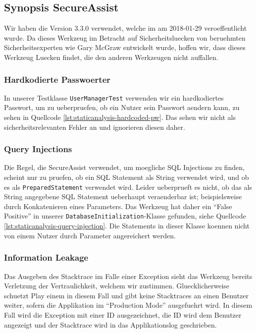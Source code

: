 \documentclass[12pt,DIV14,BCOR10mm,a4paper,twoside,parskip=half-,headsepline,headinclude,english,ngerman,bibliography=totocnumbered]{scrreprt}
\begin{document}
\subsection{Synopsis SecureAssist}

Wir haben die Version 3.3.0 verwendet, welche im am 2018-01-29 veroeffentlicht wurde.
Da dieses Werkzeug im Betracht auf Sicherheitsluecken von beruehmten Sicherheitsexperten wie Gary McGraw entwickelt wurde, hoffen wir, dass dieses Werkzeug Luecken findet, die den anderen Werkzeugen nicht auffallen.

\subsubsection{Hardkodierte Passwoerter}

In unserer Testklasse \texttt{UserManagerTest} verwenden wir ein hardkodiertes Passwort, um zu ueberpruefen, ob ein Nutzer sein Passwort aendern kann, zu sehen in Quellcode \ref{lst:staticanalysis-hardcoded-pw}.
Das sehen wir nicht als sicherheitsrelevanten Fehler an und ignorieren diesen daher.

\subsubsection{Query Injections}

Die Regel, die SecureAssist verwendet, um moegliche SQL Injections zu finden, scheint nur zu pruefen, ob ein SQL Statement als String verwendet wird, und ob es als \texttt{PreparedStatement} verwendet wird.
Leider ueberprueft es nicht, ob das als String angegebene SQL Statement ueberhaupt veraenderbar ist; beispielsweise durch Konkatenieren eines Parameters.
Das Werkzeug hat daher ein \enquote{False Positive} in unserer \texttt{DatabaseInitialization}-Klasse gefunden, siehe Quellcode \ref{lst:staticanalysis-query-injection}.
Die Statements in dieser Klasse koennen nicht von einem Nutzer durch Parameter angereichert werden.

\subsubsection{Information Leakage}

Das Ausgeben des Stacktrace im Falle einer Exception sieht das Werkzeug bereits Verletzung der Vertraulichkeit, welchem wir zustimmen.
Gluecklicherweise schuetzt Play einem in diesem Fall und gibt keine Stacktraces an einen Benutzer weiter, sofern die Applikation im \enquote{Production Mode} ausgefuehrt wird.
In diesem Fall wird die Exception mit einer ID ausgezeichnet, die ID wird dem Benutzer angezeigt und der Stacktrace wird in das Applikationslog geschrieben.
\end{document}
